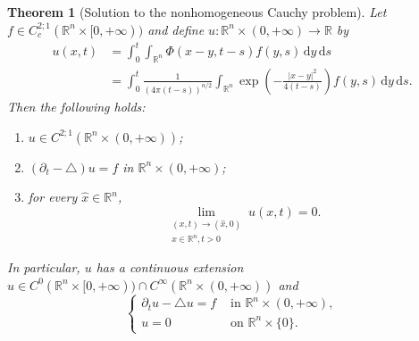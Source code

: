 \documentclass[a4paper,9pt]{amsart}
\newcommand{\R}{\mathbb{R}}	%
\newcommand{\did}{\,\mathrm{d}}	%
\newcommand{\de}{\partial}		%
\newcommand{\laplacian}{\triangle}
\theoremstyle{plain}
\newtheorem{theorem}[proposition]{Theorem}
\theoremstyle{definition}
\theoremstyle{remark}
\begin{document}
\begin{theorem}[Solution to the nonhomogeneous Cauchy problem]\label{thm67c3437d}
	Let $f\in C^{2;1}_c(\R^n\times[0,+\infty))$ and define $u:\R^n\times(0,+\infty)\to\R$ by
	\begin{equation}\label{eq67c34492}
	\begin{aligned}
		u(x,t) &= \int_0^t \int_{\R^n} \Phi(x-y,t-s) f(y,s) \did y\did s \\
		&= \int_0^t \frac{1}{(4\pi(t-s))^{n/2}} \int_{\R^n} \exp\left( - \frac{ |x-y|^2 }{ 4(t-s) } \right) f(y,s) \did y \did s .
	\end{aligned}
	\end{equation}
	Then the following holds:
	\begin{enumerate}
	\item\label{thm67c3437d_smooth}
		$u\in C^{2;1}(\R^n\times(0,+\infty))$;
	\item\label{thm67c3437d_heat}
		$(\de_t-\laplacian)u = f$ in $\R^n\times(0,+\infty)$;
	\item\label{thm67c3437d_init}
		for every $\hat x\in\R^n$, 
		\begin{equation}\label{eq67c3448d}
			\lim_{\substack{(x,t)\to(\hat x,0) \\ x\in\R^n,t>0}} u(x,t) = 0 .
		\end{equation}
	\end{enumerate}
	In particular, $u$ has a continuous extension $u\in C^0(\R^n\times [0,+\infty))\cap C^\infty(\R^n\times (0,+\infty))$ and
	\begin{equation}\label{eq67c344a9}
	\begin{cases}
		\de_t u - \laplacian u = f & \text{ in }\R^n\times (0,+\infty) , \\
		u = 0 & \text{ on }\R^n\times\{0\} .
	\end{cases}
	\end{equation}
\end{theorem}
\end{document}
